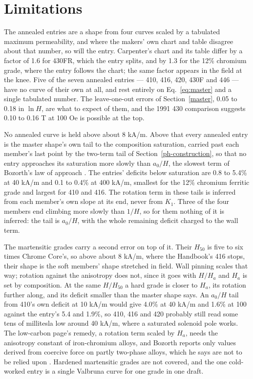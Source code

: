 \documentclass[
  11pt,
]{article}
\begin{document}
\section{Limitations}\label{limitations}

The annealed entries are a shape from four curves scaled by a tabulated maximum permeability, and where the makers' own chart and table disagree about that number, so will the entry. Carpenter's chart and its table differ by a factor of 1.6 for 430FR, which the entry splits, and by 1.3 for the 12\% chromium grade, where the entry follows the chart; the same factor appears in the field at the knee. Five of the seven annealed entries --- 410, 416, 420, 430F and 446 --- have no curve of their own at all, and rest entirely on Eq.~\eqref{eq:master} and a single tabulated number. The leave-one-out errors of Section~\ref{master}, 0.05 to 0.18 in \(\ln H\), are what to expect of them, and the 1991 430 comparison suggests 0.10 to 0.16 T at 100 Oe is possible at the top.

No annealed curve is held above about 8 kA/m. Above that every annealed entry is the master shape's own tail to the composition saturation, carried past each member's last point by the two-term tail of Section~\ref{ph-construction}, so that no entry approaches its saturation more slowly than \(a_0/H\), the slowest term of Bozorth's law of approach \cite{bozorth1951}. The entries' deficits below saturation are 0.8 to 5.4\% at 40 kA/m and 0.1 to 0.4\% at 400 kA/m, smallest for the 12\% chromium ferritic grade and largest for 410 and 416. The rotation term in these tails is inferred from each member's own slope at its end, never from \(K_1\). Three of the four members end climbing more slowly than \(1/H\), so for them nothing of it is inferred: the tail is \(a_0/H\), with the whole remaining deficit charged to the wall term.

The martensitic grades carry a second error on top of it. Their \(H_{50}\) is five to six times Chrome Core's, so above about 8 kA/m, where the Handbook's 416 stops, their shape is the soft members' shape stretched in field. Wall pinning scales that way; rotation against the anisotropy does not, since it goes with \(H/H_a\) and \(H_a\) is set by composition. At the same \(H/H_{50}\) a hard grade is closer to \(H_a\), its rotation further along, and its deficit smaller than the master shape says. An \(a_0/H\) tail from 410's own deficit at 10 kA/m would give 4.0\% at 40 kA/m and 1.6\% at 100 against the entry's 5.4 and 1.9\%, so 410, 416 and 420 probably still read some tens of millitesla low around 40 kA/m, where a saturated solenoid pole works. The low-carbon page's remedy, a rotation term scaled by \(H_a\), needs the anisotropy constant of iron-chromium alloys, and Bozorth reports only values derived from coercive force on partly two-phase alloys, which he says are not to be relied upon \cite{bozorth1951}. Hardened martensitic grades are not covered, and the one cold-worked entry is a single Valbruna curve for one grade in one draft.
\end{document}
